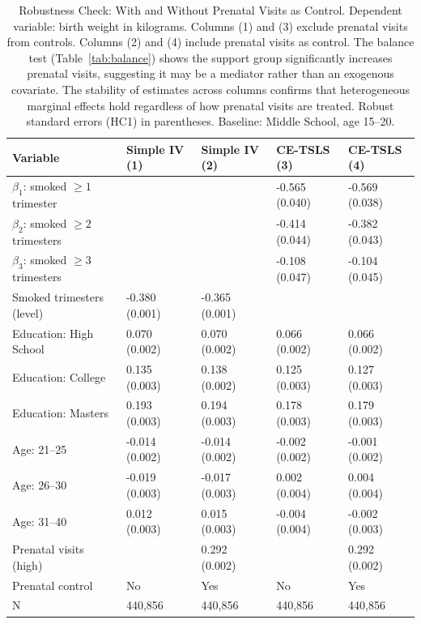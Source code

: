 \begin{table}[h!]
\centering
\caption{Robustness Check: With and Without Prenatal Visits as Control. Dependent variable: birth weight in kilograms. Columns (1) and (3) exclude prenatal visits from controls. Columns (2) and (4) include prenatal visits as control. The balance test (Table~\ref{tab:balance}) shows the support group significantly increases prenatal visits, suggesting it may be a mediator rather than an exogenous covariate. The stability of estimates across columns confirms that heterogeneous marginal effects hold regardless of how prenatal visits are treated. Robust standard errors (HC1) in parentheses. Baseline: Middle School, age 15--20.} 
\label{tab:robustness}
\begingroup\small
\begin{tabular}{lllll}
  \toprule
Variable & Simple IV (1) & Simple IV (2) & CE-TSLS (3) & CE-TSLS (4) \\ 
  \midrule
$\beta_1$: smoked $\geq 1$ trimester &  &  & -0.565 (0.040) & -0.569 (0.038) \\ 
  $\beta_2$: smoked $\geq 2$ trimesters &  &  & -0.414 (0.044) & -0.382 (0.043) \\ 
  $\beta_3$: smoked $\geq 3$ trimesters &  &  & -0.108 (0.047) & -0.104 (0.045) \\ 
  Smoked trimesters (level) & -0.380 (0.001) & -0.365 (0.001) &  &  \\ 
  Education: High School & 0.070 (0.002) & 0.070 (0.002) & 0.066 (0.002) & 0.066 (0.002) \\ 
  Education: College & 0.135 (0.003) & 0.138 (0.002) & 0.125 (0.003) & 0.127 (0.003) \\ 
  Education: Masters & 0.193 (0.003) & 0.194 (0.003) & 0.178 (0.003) & 0.179 (0.003) \\ 
  Age: 21--25 & -0.014 (0.002) & -0.014 (0.002) & -0.002 (0.002) & -0.001 (0.002) \\ 
  Age: 26--30 & -0.019 (0.003) & -0.017 (0.003) & 0.002 (0.004) & 0.004 (0.004) \\ 
  Age: 31--40 & 0.012 (0.003) & 0.015 (0.003) & -0.004 (0.004) & -0.002 (0.003) \\ 
  Prenatal visits (high) &  & 0.292 (0.002) &  & 0.292 (0.002) \\ 
  Prenatal control & No & Yes & No & Yes \\ 
  N & 440,856 & 440,856 & 440,856 & 440,856 \\ 
   \bottomrule
\end{tabular}
\endgroup
\end{table}
